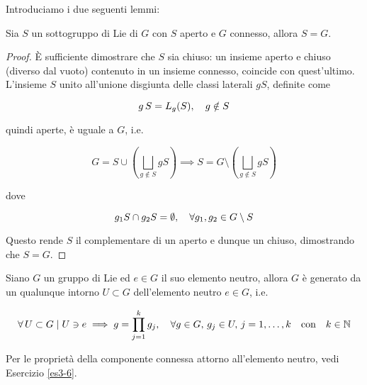 Introduciamo i due seguenti lemmi:

\begin{lemma}
	Sia $ S $ un sottogruppo di Lie di $ G $ con $ S $ aperto e $ G $ connesso, allora $ S = G $.
\end{lemma}

\begin{proof}
	È sufficiente dimostrare che $ S $ sia chiuso: un insieme aperto e chiuso (diverso dal vuoto) contenuto in un insieme connesso, coincide con quest'ultimo.\\
	L'insieme $ S $ unito all'unione disgiunta delle classi laterali $ g S $, definite come
	
	\begin{equation}
		g \, S = L_{g}(S) \qcomma g \notin S
	\end{equation}
	
	quindi aperte, è uguale a $ G $, i.e.
	
	\begin{equation}
		G = S \cup \left( \bigsqcup_{g \notin S} g S \right) %
		\implies %
		S = G \setminus \left( \bigsqcup_{g \notin S} g S \right)
	\end{equation}
	
	dove
	
	\begin{equation}
		g_{1} S \cap g_{2} S = \emptyset %
		\qcomma \forall g_{1},g_{2} \in G \setminus S
	\end{equation}
	
	Questo rende $ S $ il complementare di un aperto e dunque un chiuso, dimostrando che $ S = G $.
\end{proof}

\begin{lemma}\label{lem:lie-gr-neut-int}
	Siano $ G $ un gruppo di Lie ed $ e \in G $ il suo elemento neutro, allora $ G $ è generato da un qualunque intorno $ U \subset G $ dell'elemento neutro $ e \in G $, i.e.
	
	\begin{equation}
		\forall \, U \subset G \mid U \ni e \implies g = \prod_{j=1}^{k} g_{j} %
		\qcomma \forall g \in G, \, g_{j} \in U, \, j=1,\dots,k %
		\qq{con} k \in \N
	\end{equation}
\end{lemma}

Per le proprietà della componente connessa attorno all'elemento neutro, vedi Esercizio \ref{es3-6}.

